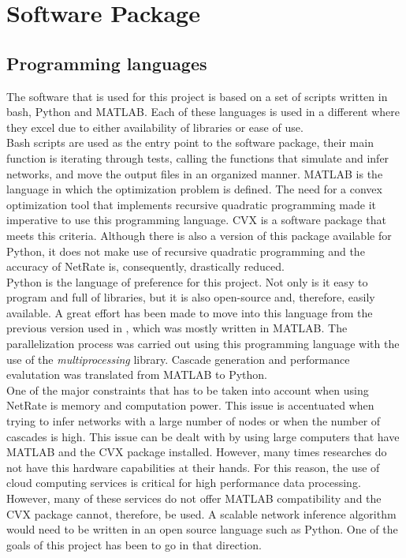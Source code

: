 
\chapter{Software Package}

\section{Programming languages}

The software that is used for this project is based on a set of scripts written in bash, Python and MATLAB. Each of these languages is used in a different where they excel due to either availability of libraries or ease of use. \\

Bash scripts are used as the entry point to the software package, their main function is iterating through tests, calling the functions that simulate and infer networks, and move the output files in an organized manner.
MATLAB is the language in which the optimization problem is defined. The need for a convex optimization tool that implements recursive quadratic programming made it imperative to use this programming language. CVX is a software package that meets this criteria. Although there is also a version of this package available for Python, it does not make use of recursive quadratic programming and the accuracy of NetRate is, consequently, drastically reduced.\\

Python is the language of preference for this project. Not only is it easy to program and full of libraries, but it is also open-source and, therefore, easily available. A great effort has been made to move into this language from the previous version used in \cite{alexandru2018estimating}, which was mostly written in MATLAB. 
The parallelization process was carried out using this programming language with the use of the \textit{multiprocessing} library. Cascade generation and performance evalutation was translated from MATLAB to Python.\\

One of the major constraints that has to be taken into account when using NetRate is memory and computation power. This issue is accentuated when trying to infer networks with a large number of nodes or when the number of cascades is high. This issue can be dealt with by using large computers that have MATLAB and the CVX package installed. However, many times researches do not have this hardware capabilities at their hands. For this reason, the use of cloud computing services is critical for high performance data processing. However, many of these services do not offer MATLAB compatibility and the CVX package cannot, therefore, be used. A scalable network inference algorithm would need to be written in an open source language such as Python. One of the goals of this project has been to go in that direction. 


